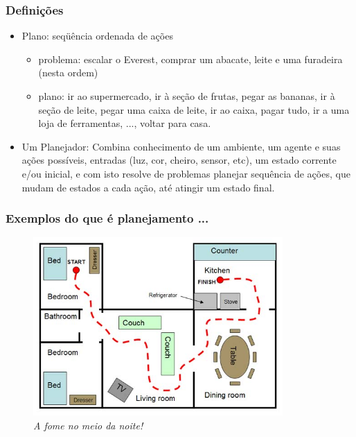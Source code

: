 \begin{frame}[fragile]

  \frametitle{Definições}

   \begin{block}{}
     \begin{itemize}
      \item Plano: seqüência ordenada de ações
       \pause
         \begin{itemize}
           \item problema: escalar o Everest, comprar um abacate, leite e uma furadeira (nesta ordem)

           \pause
            \item plano: ir ao supermercado, ir à seção de frutas, pegar as bananas, 
            ir à seção de leite, pegar uma caixa de leite, ir ao caixa,  pagar tudo, 
            ir a uma loja de ferramentas, ..., voltar para casa.
                                
         \end{itemize}

       \pause
       \item Um Planejador:
        Combina conhecimento de um ambiente, um agente e suas ações possíveis,
        entradas (luz, cor, cheiro, sensor, etc), um estado corrente
        e/ou inicial, e com isto resolve de problemas planejar sequência
        de ações, que mudam de estados a cada ação, até atingir um 
        estado final.
       
    \end{itemize}
    
    \end{block}
    
\end{frame}



\begin{frame}[fragile]
\frametitle{Exemplos do que é planejamento ...}

\begin{figure}[!htb]
\centering
\includegraphics[width=0.85\textwidth, height=0.70\textheight]{figures/planning01.jpg}
\caption{\textit{A fome no meio da noite!}}
\end{figure}


\end{frame}



